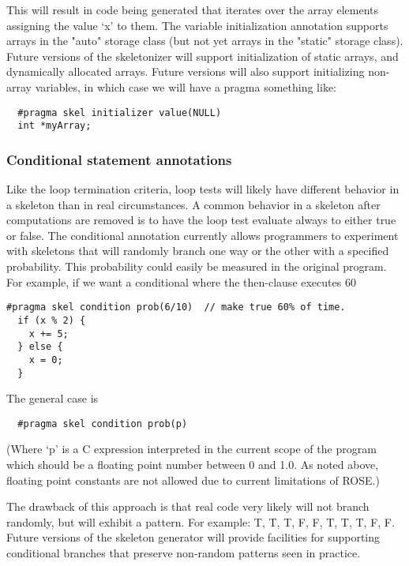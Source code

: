 \documentclass{article}
\begin{document}
This will result in code being generated that iterates over the array
elements assigning the value `x' to them.  The variable initialization
annotation supports arrays in the "auto" storage class (but not yet
arrays in the "static" storage class).
Future versions of the skeletonizer will support
initialization of static arrays, and dynamically
allocated arrays.
Future versions will also support initializing non-array variables,
in which case we will have a pragma something like:

\begin{verbatim}
  #pragma skel initializer value(NULL)
  int *myArray;
\end{verbatim}

\subsubsection{Conditional statement annotations}

Like the loop termination criteria, loop tests will likely have
different behavior in a skeleton than in real circumstances.  A common
behavior in a skeleton after computations are removed is to have the
loop test evaluate always to either true or false.  The conditional
annotation currently allows programmers to experiment with skeletons
that will randomly branch one way or the other with a specified
probability.  This probability could easily be measured in the
original program.  For example, if we want a conditional where the
then-clause executes 60%

\begin{verbatim}
#pragma skel condition prob(6/10)  // make true 60% of time.
  if (x % 2) {
    x += 5;
  } else {
    x = 0;
  }
\end{verbatim}

The general case is

\begin{verbatim}
  #pragma skel condition prob(p)
\end{verbatim}

(Where `p' is a C expression interpreted in the current scope of the program
which should be a floating point number between 0 and 1.0.  As noted above,
floating point constants are not allowed due to current limitations of
ROSE.)

The drawback of this approach is that real code very likely will not
branch randomly, but will exhibit a pattern.  For example: T, T, T, F,
F, T, T, T, F, F.  Future versions of the skeleton generator will
provide facilities for supporting conditional branches that preserve
non-random patterns seen in practice.
\end{document}

